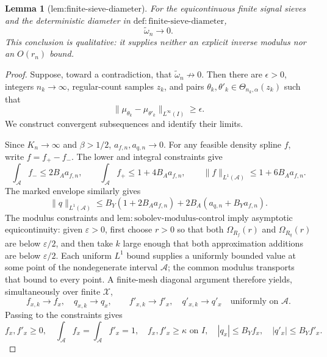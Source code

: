 \documentclass{article}
\newtheorem{lemma}{Lemma}
\begin{document}
\begin{lemma}[lem:finite-sieve-diameter]\label{lem:finite-sieve-diameter}
For the equicontinuous finite signal sieves and the deterministic diameter in \(\mathrm{def{:}finite\text{-}sieve\text{-}diameter}\),
\[
 \widetilde\omega_n\longrightarrow0.
\]
This conclusion is qualitative: it supplies neither an explicit inverse modulus nor an \(O(r_n)\) bound.
\end{lemma}
\begin{proof}
Suppose, toward a contradiction, that \(\widetilde\omega_n\not\to0\). Then there are \(\epsilon>0\), integers \(n_k\to\infty\), regular-count samples \(z_k\), and pairs \(\theta_k,\theta'_k\in\Theta_{n_k,\alpha}(z_k)\) such that
\[
 \|\mu_{\theta_k}-\mu_{\theta'_k}\|_{L^\infty(I)}\ge\epsilon.
\]
We construct convergent subsequences and identify their limits.

Since \(K_n\to\infty\) and \(\beta>1/2\), \(a_{f,n},a_{q,n}\to0\). For any feasible density spline \(f\), write \(f=f_+-f_-\). The lower and integral constraints give
\[
 \int_{\mathcal A}f_-\le2B_Aa_{f,n},
 \qquad
 \int_{\mathcal A}f_+\le1+4B_Aa_{f,n},
 \qquad
 \|f\|_{L^1(\mathcal A)}\le1+6B_Aa_{f,n}.
\]
The marked envelope similarly gives
\[
 \|q\|_{L^1(\mathcal A)}
 \le B_Y(1+2B_Aa_{f,n})+2B_A(a_{q,n}+B_Ya_{f,n}).
\]
The modulus constraints and \(\mathrm{lem{:}sobolev\text{-}modulus\text{-}control}\) imply asymptotic equicontinuity: given \(\varepsilon>0\), first choose \(r>0\) so that both \(\Omega_{R_f}(r)\) and \(\Omega_{R_q}(r)\) are below \(\varepsilon/2\), and then take \(k\) large enough that both approximation additions are below \(\varepsilon/2\). Each uniform \(L^1\) bound supplies a uniformly bounded value at some point of the nondegenerate interval \(\mathcal A\); the common modulus transports that bound to every point. A finite-mesh diagonal argument therefore yields, simultaneously over finite \(\mathcal X\),
\[
 f_{x,k}\to f_x,\quad q_{x,k}\to q_x,
 \qquad
 f'_{x,k}\to f'_x,\quad q'_{x,k}\to q'_x
 \quad\text{uniformly on }\mathcal A.
\]
Passing to the constraints gives
\[
 f_x,f'_x\ge0,\quad \int_{\mathcal A}f_x=\int_{\mathcal A}f'_x=1,
 \quad f_x,f'_x\ge\kappa\text{ on }I,
 \quad |q_x|\le B_Yf_x,\quad |q'_x|\le B_Yf'_x.
\]


\end{proof}
\end{document}
